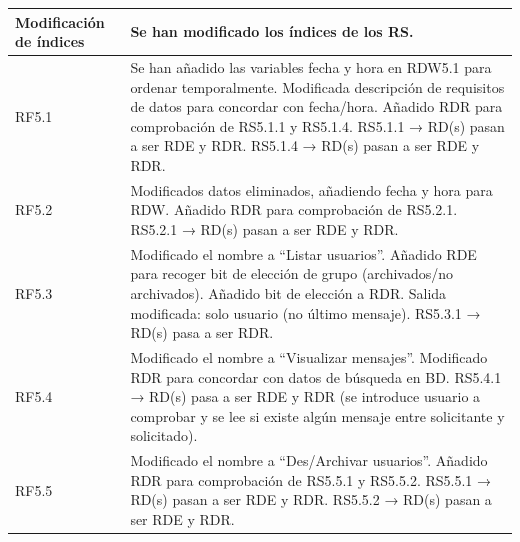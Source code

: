 \begin{longtable}{|p{3cm}|p{11cm}|}
Modificación de índices & Se han modificado los índices de los RS. \\
\hline

RF5.1 & Se han añadido las variables fecha y hora en RDW5.1 para ordenar temporalmente.  
Modificada descripción de requisitos de datos para concordar con fecha/hora.  
Añadido RDR para comprobación de RS5.1.1 y RS5.1.4.  
RS5.1.1 → RD(s) pasan a ser RDE y RDR.  
RS5.1.4 → RD(s) pasan a ser RDE y RDR. \\
\hline

RF5.2 & Modificados datos eliminados, añadiendo fecha y hora para RDW.  
Añadido RDR para comprobación de RS5.2.1.  
RS5.2.1 → RD(s) pasan a ser RDE y RDR. \\
\hline

RF5.3 & Modificado el nombre a “Listar usuarios”.  
Añadido RDE para recoger bit de elección de grupo (archivados/no archivados).  
Añadido bit de elección a RDR.  
Salida modificada: solo usuario (no último mensaje).  
RS5.3.1 → RD(s) pasa a ser RDR. \\
\hline

RF5.4 & Modificado el nombre a “Visualizar mensajes”.  
Modificado RDR para concordar con datos de búsqueda en BD.  
RS5.4.1 → RD(s) pasa a ser RDE y RDR (se introduce usuario a comprobar y se lee si existe algún mensaje entre solicitante y solicitado). \\
\hline

RF5.5 & Modificado el nombre a “Des/Archivar usuarios”.  
Añadido RDR para comprobación de RS5.5.1 y RS5.5.2.  
RS5.5.1 → RD(s) pasan a ser RDE y RDR.  
RS5.5.2 → RD(s) pasan a ser RDE y RDR. \\
\hline


\end{longtable}
